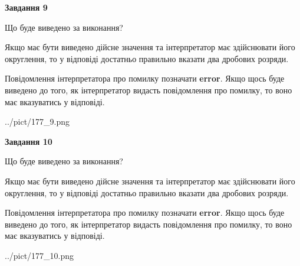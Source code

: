 \documentclass[12pt, ukrainian]{article}
\begin{document}
{\begin {Large}
{\begin {center}\textbf{Завдання 9}\end {center}}\par
Що буде виведено за виконання? \par

Якщо має бути виведено дійсне значення та інтерпретатор має здійснювати його округлення, 
то у відповіді достатньо правильно вказати два дробових розряди.

Повідомлення інтерпретатора про помилку позначати \textbf{error}.
Якщо щось буде виведено до того, як інтерпретатор видасть повідомлення про помилку, 
то воно має вказуватись у відповіді. \par

\begin{center}
	{../pict/177_9.png}
\end{center}
\newpage

{\begin {center}\textbf{Завдання 10}\end {center}}\par
Що буде виведено за виконання? \par

Якщо має бути виведено дійсне значення та інтерпретатор має здійснювати його округлення, 
то у відповіді достатньо правильно вказати два дробових розряди.

Повідомлення інтерпретатора про помилку позначати \textbf{error}.
Якщо щось буде виведено до того, як інтерпретатор видасть повідомлення про помилку, 
то воно має вказуватись у відповіді. \par

\begin{center}
	{../pict/177_10.png}
\end{center}
\newpage

\end {Large}}
\end{document}
